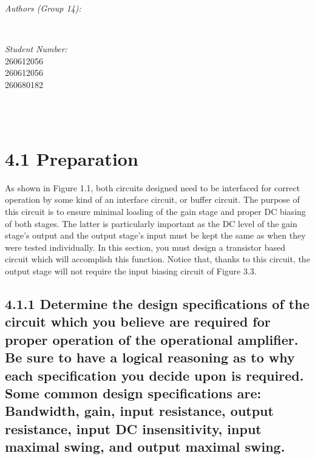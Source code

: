 \documentclass[12pt]{article}
\makeatletter
\let\theauthor\@author
\let\thedate\@date
\makeatother
\begin{document}
\begin{titlepage}
\begin{minipage}{0.4\textwidth}
\begin{flushleft}
            \emph{Authors (Group 14):}\\
            \theauthor
            \end{flushleft}
            \end{minipage}~
            \begin{minipage}{0.4\textwidth}
            \begin{flushright} \large
            \emph{Student Number:} \\
            260612056 \\ 260612056 \\ 260680182                                  %
        \end{flushright}
    \end{minipage}\\[2 cm]
 
    {\large \thedate}\\[2 cm]
 
    \vfill
    
\end{titlepage}


\section*{4.1 Preparation}

As shown in Figure 1.1, both circuits designed need to be interfaced for correct operation 
by some kind of an interface circuit, or buffer circuit. The purpose of this circuit is to 
ensure minimal loading of the gain stage and proper DC biasing of both stages. The latter 
is particularly important as the DC level of the gain stage’s output and the output stage’s 
input must be kept the same as when they were tested individually. In this section, you 
must design a transistor based circuit which will accomplish this function. Notice that, 
thanks to this circuit, the output stage will not require the input biasing circuit of Figure 3.3.          

\subsection*{4.1.1 Determine the design specifications of the circuit which you 
believe are required for proper operation of the operational amplifier. 
Be sure to have a logical reasoning as to why each specification you decide 
upon is required. Some common design specifications are: Bandwidth, gain, 
input resistance, output resistance, input DC insensitivity, input maximal 
swing, and output maximal swing. }
\end{document}
